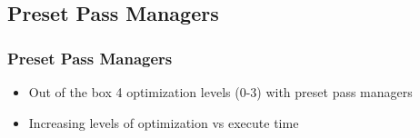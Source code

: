 \documentclass[aspectratio=169,11pt,hyperref={colorlinks=true}]{beamer}
\begin{document}
\subsection{Preset Pass Managers}
\begin{frame}
    \frametitle{Preset Pass Managers}
    \begin{itemize}
        \item Out of the box 4 optimization levels (0-3) with preset pass managers
        \item Increasing levels of optimization vs execute time
    \end{itemize}
\end{frame}
\begin{frame}
    \centering
\end{frame}
\end{document}

